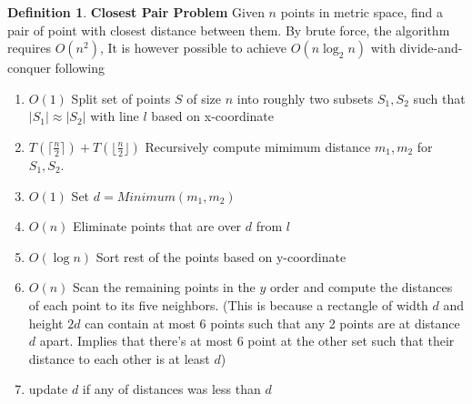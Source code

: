 \documentclass[11pt]{article}
\theoremstyle{plain}%
\theoremstyle{definition}
\newtheorem{defn}{Definition}
\theoremstyle{remark}
\begin{document}
\begin{defn}
  \label{closest pair problem}
  \textbf{Closest Pair Problem} Given $n$ points in metric space, find a pair of point with closest distance between them. By brute force, the algorithm requires $O(n^2)$, It is however possible to achieve $O(n\log_2{n})$ with divide-and-conquer following
  \begin{enumerate}
    \item $O(1)$ Split set of points $S$ of size $n$ into roughly two subsets $S_1, S_2$ such that $|S_1| \approx |S_2|$ with line $l$ based on x-coordinate
    \item $T(\lceil \frac{n}{2}\rceil) + T(\lfloor \frac{n}{2}\rfloor)$ Recursively compute mimimum distance $m_1, m_2$ for $S_1, S_2$.
    \item $O(1)$ Set $d = Minimum(m_1, m_2)$
    \item $O(n)$ Eliminate points that are over $d$ from $l$
    \item $O(\log{n})$ Sort rest of the points based on y-coordinate
    \item $O(n)$ Scan the remaining points in the $y$ order and compute the distances of each point to its five neighbors. (This is because a rectangle of width $d$ and height $2d$ can contain at most 6 points such that any 2 points are at distance $d$ apart. Implies that there's at most 6 point at the other set such that their distance to each other is at least $d$)
    \item update $d$ if any of distances was less than $d$
  \end{enumerate}

\end{defn}





\end{document}
